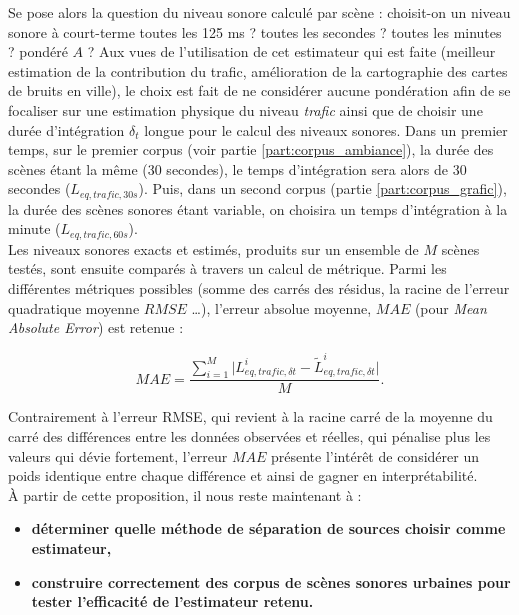 Se pose alors la question du niveau sonore calculé par scène : choisit-on un niveau sonore à court-terme toutes les 125 ms ? toutes les secondes ? toutes les minutes ? pondéré $A$ ? Aux vues de l'utilisation de cet estimateur qui est faite (meilleur estimation de la contribution du trafic, amélioration de la cartographie des cartes de bruits en ville), le choix est fait de ne considérer aucune pondération afin de se focaliser sur une estimation physique du niveau \textit{trafic} ainsi que de choisir une durée d'intégration $\delta_t$ longue pour le calcul des niveaux sonores.
Dans un premier temps, sur le premier corpus (voir partie \ref{part:corpus_ambiance}), la durée des scènes étant la même (30 secondes), le temps d'intégration sera alors de 30 secondes ($L_{eq,trafic,30s}$). Puis, dans un second corpus (partie \ref{part:corpus_grafic}), la durée des scènes sonores étant variable, on choisira un temps d'intégration à la minute ($L_{eq,trafic,60s}$).\\

Les niveaux sonores exacts et estimés, produits sur un ensemble de $M$ scènes testés, sont ensuite comparés à travers un calcul de métrique. Parmi les différentes métriques possibles (somme des carrés des résidus, la racine de l'erreur quadratique moyenne $RMSE$ \dots), l'erreur absolue moyenne, $MAE$ (pour \textit{Mean Absolute Error}) est retenue :

\begin{equation}
MAE = \frac{\sum_{i = 1}^{M} \vert L_{eq, trafic, \delta t}^i - \tilde{L}_{eq, trafic, \delta t}^i \vert}{M}.
\end{equation}

Contrairement à l'erreur RMSE, qui revient à la racine carré de la moyenne du carré des différences entre les données observées et réelles, qui pénalise plus les valeurs qui dévie fortement, l'erreur $MAE$ présente l'intérêt de considérer un poids identique entre chaque différence et ainsi de gagner en interprétabilité.\\

À partir de cette proposition, il nous reste maintenant à :
\begin{itemize}
\item \textbf{déterminer quelle méthode de séparation de sources choisir comme estimateur, }
\item \textbf{construire correctement des corpus de scènes sonores urbaines pour tester l'efficacité de l'estimateur retenu.}
\end{itemize}



%

%
%
%
